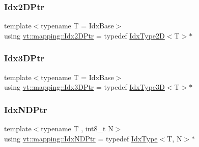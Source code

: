 \mbox{\label{namespacevt_1_1mapping_a6832cbb1361fe72fd7ec730e7b7773b3}} 
\subsubsection{\texorpdfstring{Idx2\+D\+Ptr}{Idx2DPtr}}
{\footnotesize\ttfamily template$<$typename T  = Idx\+Base$>$ \\
using \hyperlink{namespacevt_1_1mapping_a6832cbb1361fe72fd7ec730e7b7773b3}{vt\+::mapping\+::\+Idx2\+D\+Ptr} = typedef \hyperlink{namespacevt_ab0fbc5ddf69b5aa0ed6a8d1658b504eb}{Idx\+Type2D}$<$T$>$$\ast$}

\mbox{\label{namespacevt_1_1mapping_aacc737158b6517f2d760ffc8d1b5abca}} 
\subsubsection{\texorpdfstring{Idx3\+D\+Ptr}{Idx3DPtr}}
{\footnotesize\ttfamily template$<$typename T  = Idx\+Base$>$ \\
using \hyperlink{namespacevt_1_1mapping_aacc737158b6517f2d760ffc8d1b5abca}{vt\+::mapping\+::\+Idx3\+D\+Ptr} = typedef \hyperlink{namespacevt_a65e4a83c0567ecb7a54b78e9b8e7d7ab}{Idx\+Type3D}$<$T$>$$\ast$}

\mbox{\label{namespacevt_1_1mapping_ab77f5302cd346d499e48a8c796043746}} 
\subsubsection{\texorpdfstring{Idx\+N\+D\+Ptr}{IdxNDPtr}}
{\footnotesize\ttfamily template$<$typename T , int8\+\_\+t N$>$ \\
using \hyperlink{namespacevt_1_1mapping_ab77f5302cd346d499e48a8c796043746}{vt\+::mapping\+::\+Idx\+N\+D\+Ptr} = typedef \hyperlink{namespacevt_a906c25b521ff516f5e8ba6d96fe2d424}{Idx\+Type}$<$T, N$>$$\ast$}

\mbox{\label{namespacevt_1_1mapping_a1bcab0d331bff853fe09c964d5e9cc8c}} 
